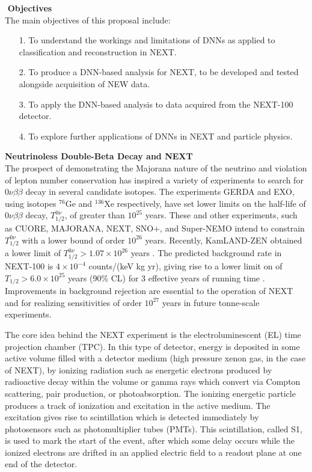 \documentclass[11pt,a4paper]{article}
\begin{document}
\noindent\textbf{\textbullet\,\,Objectives}\\
The main objectives of this proposal include:

\begin{enumerate}[itemsep=-1mm]
	\item[1.] To understand the workings and limitations of DNNs as applied to classification and reconstruction in NEXT.
	\item[2.] To produce a DNN-based analysis for NEXT, to be developed and tested alongside acquisition of NEW data.
	\item[3.] To apply the DNN-based analysis to data acquired from the NEXT-100 detector.
	\item[4.] To explore further applications of DNNs in NEXT and particle physics.
\end{enumerate}

\noindent\textbf{Neutrinoless Double-Beta Decay and NEXT}\\
The prospect of demonstrating the Majorana nature of the neutrino and violation of lepton number conservation has inspired a variety of experiments to search for $0\nu\beta\beta$ decay in several candidate isotopes.  The experiments GERDA and EXO, using isotopes $^{76}$Ge and $^{136}$Xe respectively, have set lower limits on the half-life of $0\nu\beta\beta$ decay, $T_{1/2}^{0\nu}$, of greater than $10^{25}$ years.  These and other experiments, such as CUORE, MAJORANA, NEXT, SNO+, and Super-NEMO intend to constrain $T_{1/2}^{0\nu}$ with a lower bound of order $10^{26}$ years.  Recently, KamLAND-ZEN obtained a lower limit of $T_{1/2}^{0\nu} > 1.07\times 10^{26}$ years \cite{KamLANDZen_2016}. The predicted background rate in NEXT-100 is $4 \times 10^{-4}$ counts/(keV kg yr), giving rise to a lower limit on  of $T_{1/2} > 6.0\times 10^{25}$ years (90\% CL) for 3 effective years of running time \cite{NEXT_sensitivity}.  Improvements in background rejection are essential to the operation of NEXT and for realizing sensitivities of order $10^{27}$ years in future tonne-scale experiments.

The core idea behind the NEXT experiment is the electroluminescent (EL) time projection chamber (TPC). In this type of detector, energy is deposited in some active volume filled with a detector medium (high pressure xenon gas, in the case of NEXT), by ionizing radiation such as energetic electrons produced by radioactive decay within the volume or gamma rays which convert via Compton scattering, pair production, or photoabsorption. The ionizing energetic particle produces a track of ionization and excitation in the active medium. The excitation gives rise to scintillation which is detected immediately by photosensors such as photomultiplier tubes (PMTs). This scintillation, called S1, is used to mark the start of the event, after which some delay occurs while the ionized electrons are drifted in an applied electric field to a readout plane at one end of the detector. 
\end{document}
